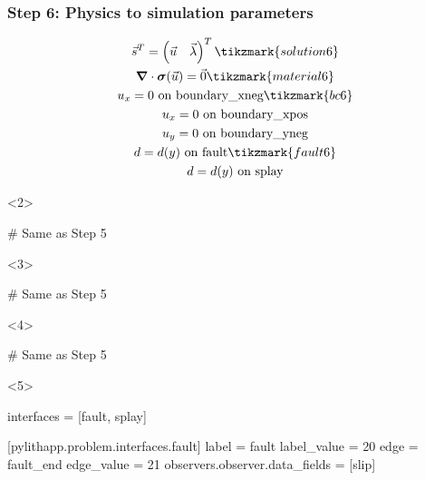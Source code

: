 \documentclass[aspectratio=169]{beamer}
\begin{document}
\begin{frame}[t,fragile]
  \frametitle{Step 6: Physics to simulation parameters}
  \summary{}

  \begin{minipage}[t]{0.3\textwidth}
    {\scriptsize
    \begin{gather*}
    \vec{s}^T = \left( \vec{u} \quad \vec{\lambda} \right)^T \tikzmark{solution6}\\
    \tensor{\nabla} \cdot \tensor{\sigma}(\vec{u}) = \vec{0} \tikzmark{material6}\\
    u_x = 0 \text{ on boundary\_xneg} \tikzmark{bc6}\\
    u_x = 0 \text{ on boundary\_xpos} \\
    u_y = 0 \text{ on boundary\_yneg} \\
    d = d(y) \text{ on fault} \tikzmark{fault6} \\
    d = d(y) \text{ on splay}
    \end{gather*}}
  \end{minipage}
  \hfill
  \begin{minipage}[t]{0.67\textwidth}
    \begin{onlyenv}<2>
      \begin{cfgcode}
        # Same as Step 5
      \end{cfgcode}
    \end{onlyenv}
    \begin{onlyenv}<3>
      \begin{cfgcode}
        # Same as Step 5
      \end{cfgcode}
    \end{onlyenv}
    \begin{onlyenv}<4>
      \begin{cfgcode}
        # Same as Step 5
      \end{cfgcode}
    \end{onlyenv}
    \begin{onlyenv}<5>
      \begin{cfgcode}
        interfaces = [fault, splay]

        [pylithapp.problem.interfaces.fault]
        label = fault
        label_value = 20
        edge = fault_end
        edge_value = 21
        observers.observer.data_fields = [slip]


\end{cfgcode}
\end{onlyenv}
\end{minipage}
\end{frame}
\end{document}
